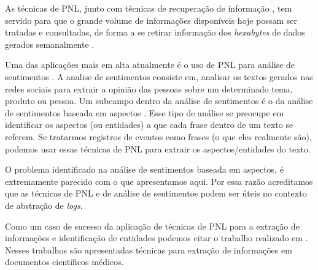 \documentclass[
	12pt,				%
	openright,			%
	twoside,			%
	a4paper,			%
	english,			%
	spanish,			%
	brazil,				%
	]{abntex2}
\begin{document}
As técnicas de PNL, junto com técnicas de recuperação de informação \cite{manning2008introduction}, tem servido para que o grande volume de informações disponíveis hoje possam ser tratadas e consultadas, de forma a se retirar informação dos \emph{hexabytes} de dados gerados semanalmente \cite{cambria2014jumping}.


Uma das aplicações mais em alta atualmente é o uso de PNL para análise de sentimentos \cite{feldman2013techniques}. A analise de sentimentos consiste em, analisar os textos gerados nas redes sociais para extrair a opinião das pessoas sobre um determinado tema, produto ou pessoa. Um subcampo dentro da análise de sentimentos é o da análise de sentimentos baseada em aspectos \cite{feldman2013techniques}. Esse tipo de análise se preocupe em identificar os aspectos (ou entidades) a que cada frase dentro de um texto se referem. Se tratarmos registros de eventos como frases (o que eles realmente são), podemos usar essas técnicas de PNL para extrair os aspectos/entidades do texto.

O problema identificado na análise de sentimentos baseada em aspectos, é extremamente parecido com o que apresentamos aqui. Por essa razão acreditamos que as técnicas de PNL e de análise de sentimentos podem ser úteis no contexto de abstração de \emph{logs}.


Como um caso de sucesso da aplicação de técnicas de PNL para a extração de informações e identificação de entidades podemos citar o trabalho realizado em \cite{matos2010environment, duque2012processo}. Nesses trabalhos são apresentadas técnicas para extração de informações em documentos científicos médicos.


\end{document}
